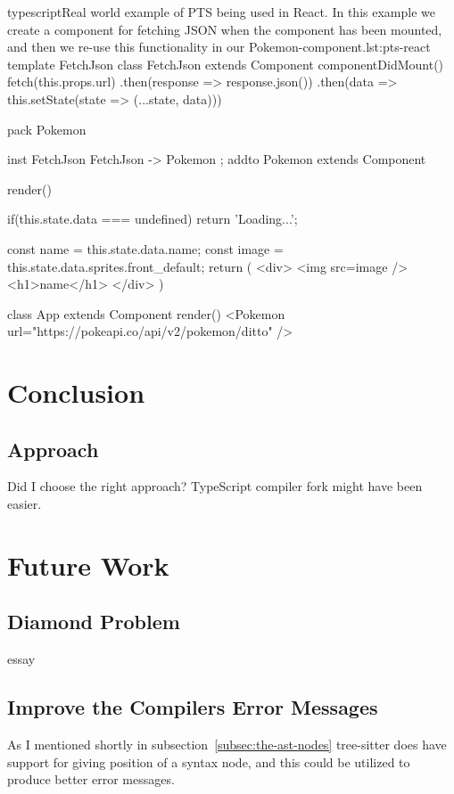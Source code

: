 \begin{code}{typescript}{Real world example of PTS being used in React. In this example we create a component for fetching JSON when the component has been mounted, and then we re-use this functionality in our Pokemon-component.}{lst:pts-react}
    template FetchJson {
        class FetchJson extends Component {
            componentDidMount() {
                fetch(this.props.url)
                .then(response => response.json())
                .then(data =>
                this.setState(state => ({...state, data})))
            }
        }
    }

    pack Pokemon {
        inst FetchJson { FetchJson -> Pokemon };
        addto Pokemon extends Component {
            render() {
                if(this.state.data === undefined)
                return 'Loading...';

                const name = this.state.data.name;
                const image = this.state.data.sprites.front_default;
                return (
                <div>
                <img src={image} />
                <h1>{name}</h1>
                </div>
                )
            }
        }

        class App extends Component {
            render() {
                <Pokemon
                url="https://pokeapi.co/api/v2/pokemon/ditto" />
            }
        }
    }
\end{code}

\section{Conclusion}\label{sec:result-conclusion}

\subsection{Approach}\label{subsec:result-approach}

Did I choose the right approach?
TypeScript compiler fork might have been easier.


\section{Future Work}\label{sec:future-work}

\subsection{Diamond Problem}\label{subsec:diamond-problem}

essay

\subsection{Improve the Compilers Error Messages}\label{subsec:compiler-with-focus-on-error-messages}

As I mentioned shortly in subsection~\vref{subsec:the-ast-nodes} tree-sitter does have support for giving position of a syntax node, and this could be utilized to produce better error messages.
